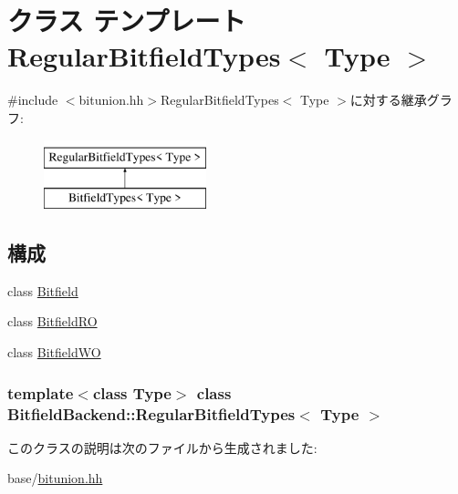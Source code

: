 \hypertarget{classBitfieldBackend_1_1RegularBitfieldTypes}{
\section{クラス テンプレート RegularBitfieldTypes$<$ Type $>$}
\label{classBitfieldBackend_1_1RegularBitfieldTypes}
}


{\ttfamily \#include $<$bitunion.hh$>$}RegularBitfieldTypes$<$ Type $>$に対する継承グラフ:\begin{figure}[H]
\begin{center}
\leavevmode
\includegraphics[height=2cm]{classBitfieldBackend_1_1RegularBitfieldTypes}
\end{center}
\end{figure}
\subsection*{構成}
\begin{DoxyCompactItemize}
\item 
class \hyperlink{classBitfieldBackend_1_1RegularBitfieldTypes_1_1Bitfield}{Bitfield}
\item 
class \hyperlink{classBitfieldBackend_1_1RegularBitfieldTypes_1_1BitfieldRO}{BitfieldRO}
\item 
class \hyperlink{classBitfieldBackend_1_1RegularBitfieldTypes_1_1BitfieldWO}{BitfieldWO}
\end{DoxyCompactItemize}
\subsubsection*{template$<$class Type$>$ class BitfieldBackend::RegularBitfieldTypes$<$ Type $>$}



このクラスの説明は次のファイルから生成されました:\begin{DoxyCompactItemize}
\item 
base/\hyperlink{bitunion_8hh}{bitunion.hh}\end{DoxyCompactItemize}

